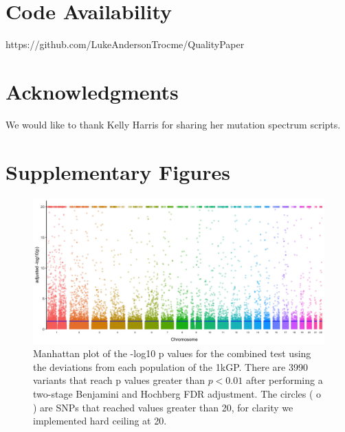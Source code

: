 \documentclass[9pt,lineno]{elife}
\begin{document}
\section{Code Availability}
https://github.com/LukeAndersonTrocme/QualityPaper

\section{Acknowledgments}
We would like to thank Kelly Harris for sharing her mutation spectrum scripts.


%


\section{Supplementary Figures}
\renewcommand{\thefigure}{S\arabic{figure}}
\setcounter{figure}{0}   	

\begin{figure}
\includegraphics[width=\hsize,keepaspectratio]{./Figures/ManhattanPlot_adjusted.jpg}

\caption{Manhattan plot of the -log10 p values for the combined test using the deviations from each population of the 1kGP. 
There are 3990 variants that reach p values greater than $ p < 0.01$ after performing a two-stage Benjamini and Hochberg FDR adjustment. 
The circles ( o ) are SNPs that reached values greater than 20, for clarity we implemented hard ceiling at 20.}
  \label{Manhattan}
\end{figure}
\end{document}
